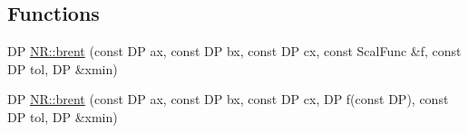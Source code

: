 \subsection*{Functions}
\begin{DoxyCompactItemize}
\item 
DP \mbox{\hyperlink{namespaceNR_aff9bab8f86d05c799cb643f8d3f4727b}{N\+R\+::brent}} (const DP ax, const DP bx, const DP cx, const Scal\+Func \&f, const DP tol, DP \&xmin)
\item 
DP \mbox{\hyperlink{namespaceNR_a949db0b9cc65ac1f2224f5c48384f58a}{N\+R\+::brent}} (const DP ax, const DP bx, const DP cx, DP f(const DP), const DP tol, DP \&xmin)
\end{DoxyCompactItemize}

